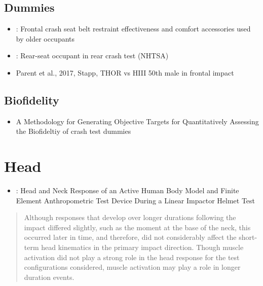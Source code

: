 \documentclass[]{book}
\providecommand{\tightlist}{%
  \setlength{\itemsep}{0pt}\setlength{\parskip}{0pt}}
\begin{document}
\hypertarget{dummies}{%
\section{Dummies}\label{dummies}}

\begin{itemize}
\item
  \citet{Whyte2019}: Frontal crash seat belt restraint effectiveness and comfort accessories used by older occupants
\item
  \citet{Viano2018}: Rear-seat occupant in rear crash test (NHTSA)
\item
  Parent et al., 2017, Stapp, THOR vs HIII 50th male in frontal impact
\end{itemize}

\hypertarget{biofidelity}{%
\section{Biofidelity}\label{biofidelity}}

\begin{itemize}
\tightlist
\item
  A Methodology for Generating Objective Targets for Quantitatively Assessing the Biofideltiy of crash test dummies \citep{Rhule2009}
\end{itemize}

\hypertarget{head}{%
\chapter{Head}\label{head}}

\begin{itemize}
\tightlist
\item
  \citet{Bruneau2019}: Head and Neck Response of an Active Human Body Model and Finite Element Anthropometric Test Device During a Linear Impactor Helmet Test
\end{itemize}

\begin{quote}
Although responses that develop over longer durations following the impact differed slightly, such as the moment at the base of the neck, this occurred later in time, and therefore, did not considerably affect the short-term head kinematics in the primary impact direction. Though muscle activation did not play a strong role in the head response for the test configurations considered, muscle activation may play a role in longer duration events.
\end{quote}
\end{document}
